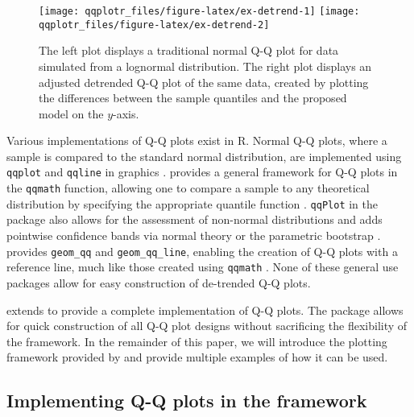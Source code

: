 \begin{Schunk}
\begin{figure}

{\centering \texttt{[image: qqplotr\_files/figure-latex/ex-detrend-1]} \texttt{[image: qqplotr\_files/figure-latex/ex-detrend-2]} 

}

\caption[The left plot displays a traditional normal Q-Q plot for data simulated from a lognormal distribution]{The left plot displays a traditional normal Q-Q plot for data simulated from a lognormal distribution. The right plot displays an adjusted detrended Q-Q plot of the same data, created by plotting the differences between the sample quantiles and the proposed model on the $y$-axis.}\label{fig:ex-detrend}
\end{figure}
\end{Schunk}

Various implementations of Q-Q plots exist in R. Normal Q-Q plots, where
a sample is compared to the standard normal distribution, are
implemented using \texttt{qqplot} and \texttt{qqline} in 
graphics \citep{R}.  provides a general framework for Q-Q
plots in the \texttt{qqmath} function, allowing one to compare a sample
to any theoretical distribution by specifying the appropriate quantile
function \citep{lattice}. \texttt{qqPlot} in the  package also
allows for the assessment of non-normal distributions and adds pointwise
confidence bands via normal theory or the parametric bootstrap
\citep{car}.  provides \texttt{geom\_qq} and
\texttt{geom\_qq\_line}, enabling the creation of Q-Q plots with a
reference line, much like those created using \texttt{qqmath}
\citep{ggplot2}. None of these general use packages allow for easy
construction of de-trended Q-Q plots.

 extends  to provide a complete implementation
of Q-Q plots. The package allows for quick construction of all Q-Q plot
designs without sacrificing the flexibility of the 
framework. In the remainder of this paper, we will introduce the
plotting framework provided by  and provide multiple
examples of how it can be used.

\subsection{\texorpdfstring{Implementing Q-Q plots in the 
framework}{Implementing Q-Q plots in the  framework}}\label{implementing-q-q-plots-in-the-framework}


